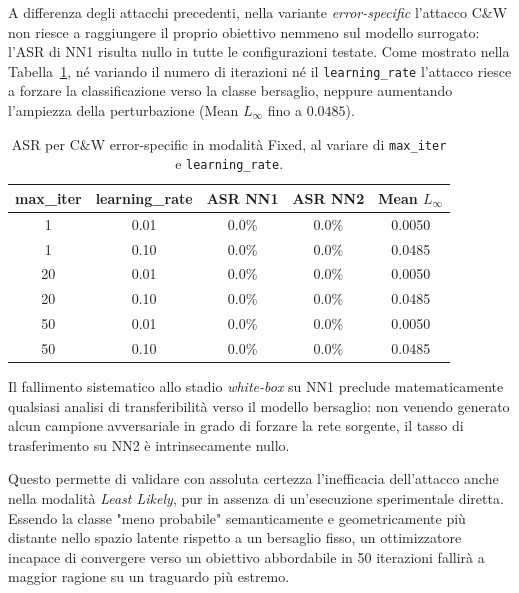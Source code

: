 \documentclass[a4paper, 12pt]{article}
\begin{document}
A differenza degli attacchi precedenti, nella variante \textit{error-specific} 
l'attacco C\&W non riesce a raggiungere il proprio obiettivo nemmeno sul modello 
surrogato: l'ASR di NN1 risulta nullo in tutte le configurazioni testate. Come 
mostrato nella Tabella~\ref{tab:cw_es_transferability}, né variando il numero di 
iterazioni né il \texttt{learning\_rate} l'attacco riesce a forzare la 
classificazione verso la classe bersaglio, neppure aumentando l'ampiezza della 
perturbazione (Mean $L_\infty$ fino a $0.0485$).

\begin{table}[ht]
    \centering
    \vspace{0.2cm}
    \small
    \setlength{\tabcolsep}{8pt}
    \renewcommand{\arraystretch}{1.2}
    \begin{tabular}{ccccc}
        \toprule
        \textbf{max\_iter} & \textbf{learning\_rate}
        & \textbf{ASR NN1} & \textbf{ASR NN2} & \textbf{Mean $L_\infty$} \\
        \midrule
        1   & 0.01 & 0.0\% & 0.0\% & 0.0050 \\
        1   & 0.10 & 0.0\% & 0.0\% & 0.0485 \\
        20  & 0.01 & 0.0\% & 0.0\% & 0.0050 \\
        20  & 0.10 & 0.0\% & 0.0\% & 0.0485 \\
        50  & 0.01 & 0.0\% & 0.0\% & 0.0050 \\
        50  & 0.10 & 0.0\% & 0.0\% & 0.0485 \\
        \bottomrule
    \end{tabular}
    \caption{ASR per C\&W error-specific in 
    modalità Fixed, al variare di \texttt{max\_iter} e \texttt{learning\_rate}.}
    \label{tab:cw_es_transferability}
\end{table}

Il fallimento sistematico allo stadio \textit{white-box} su NN1 preclude matematicamente 
qualsiasi analisi di transferibilità verso il modello bersaglio: non venendo generato alcun 
campione avversariale in grado di forzare la rete sorgente, il tasso di trasferimento su NN2 è 
intrinsecamente nullo.

Questo permette di validare con assoluta certezza l'inefficacia dell'attacco anche nella modalità 
\textit{Least Likely}, pur in assenza di un'esecuzione sperimentale diretta. 
Essendo la classe "meno probabile" semanticamente e geometricamente più distante nello spazio 
latente rispetto a un bersaglio fisso, un ottimizzatore incapace di convergere verso un obiettivo 
abbordabile in 50 iterazioni fallirà a maggior ragione su un traguardo più estremo. 
\end{document}
